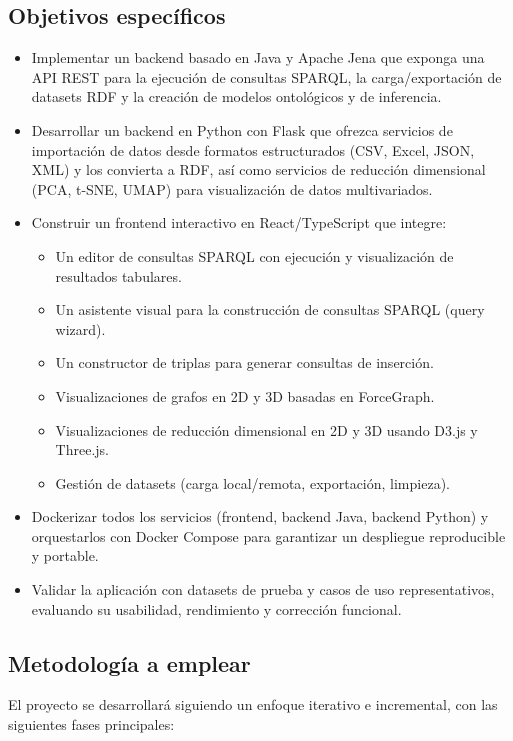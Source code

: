 \documentclass{article}
\begin{document}
\subsection*{Objetivos específicos}
\begin{itemize}[leftmargin=*]
    \item Implementar un backend basado en Java y Apache Jena que exponga una API REST para la ejecución de consultas SPARQL, la carga/exportación de datasets RDF y la creación de modelos ontológicos y de inferencia.
    \item Desarrollar un backend en Python con Flask que ofrezca servicios de importación de datos desde formatos estructurados (CSV, Excel, JSON, XML) y los convierta a RDF, así como servicios de reducción dimensional (PCA, t-SNE, UMAP) para visualización de datos multivariados.
    \item Construir un frontend interactivo en React/TypeScript que integre:
        \begin{itemize}
            \item Un editor de consultas SPARQL con ejecución y visualización de resultados tabulares.
            \item Un asistente visual para la construcción de consultas SPARQL (query wizard).
            \item Un constructor de triplas para generar consultas de inserción.
            \item Visualizaciones de grafos en 2D y 3D basadas en ForceGraph.
            \item Visualizaciones de reducción dimensional en 2D y 3D usando D3.js y Three.js.
            \item Gestión de datasets (carga local/remota, exportación, limpieza).
        \end{itemize}
    \item Dockerizar todos los servicios (frontend, backend Java, backend Python) y orquestarlos con Docker Compose para garantizar un despliegue reproducible y portable.
    \item Validar la aplicación con datasets de prueba y casos de uso representativos, evaluando su usabilidad, rendimiento y corrección funcional.
\end{itemize}

\subsection*{Metodología a emplear}
El proyecto se desarrollará siguiendo un enfoque iterativo e incremental, con las siguientes fases principales:
\end{document}
